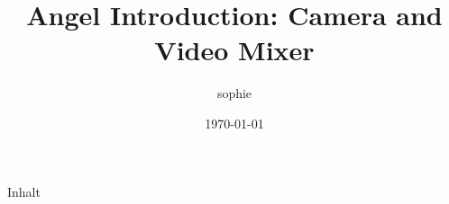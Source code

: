 \documentclass[aspectratio=169]{beamer}
\title{Angel Introduction: Camera and Video Mixer}
\date{\today \currenttime}
\author{sophie}
\institute{C3VOC}
\begin{document}

\maketitle

\begin{frame}{Inhalt}
\tableofcontents
\end{frame}


\newpage









%














\end{document}
